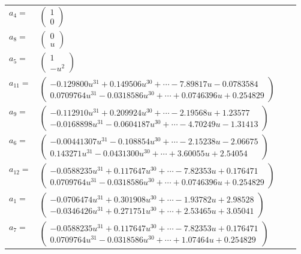 \documentclass[1p]{elsarticle_modified}
\theoremstyle{definition}
\begin{document}
\begin{tabular}{m{7pt} m{180pt} m{7pt} m{180pt} }
\flushright $a_{4}=$&$\begin{pmatrix}1\\0\end{pmatrix}$ \\
\flushright $a_{8}=$&$\begin{pmatrix}0\\u\end{pmatrix}$ \\
\flushright $a_{5}=$&$\begin{pmatrix}1\\- u^2\end{pmatrix}$ \\
\flushright $a_{11}=$&$\begin{pmatrix}-0.129800 u^{31}+0.149506 u^{30}+\cdots-7.89817 u-0.0783584\\0.0709764 u^{31}-0.0318586 u^{30}+\cdots+0.0746396 u+0.254829\end{pmatrix}$ \\
\flushright $a_{9}=$&$\begin{pmatrix}-0.112910 u^{31}+0.209924 u^{30}+\cdots-2.19568 u+1.23577\\-0.0168898 u^{31}-0.0604187 u^{30}+\cdots-4.70249 u-1.31413\end{pmatrix}$ \\
\flushright $a_{6}=$&$\begin{pmatrix}-0.00441307 u^{31}-0.108854 u^{30}+\cdots-2.15238 u-2.06675\\0.143271 u^{31}-0.0431300 u^{30}+\cdots+3.60055 u+2.54054\end{pmatrix}$ \\
\flushright $a_{12}=$&$\begin{pmatrix}-0.0588235 u^{31}+0.117647 u^{30}+\cdots-7.82353 u+0.176471\\0.0709764 u^{31}-0.0318586 u^{30}+\cdots+0.0746396 u+0.254829\end{pmatrix}$ \\
\flushright $a_{1}=$&$\begin{pmatrix}-0.0706474 u^{31}+0.301908 u^{30}+\cdots-1.93782 u+2.98528\\-0.0346426 u^{31}+0.271751 u^{30}+\cdots+2.53465 u+3.05041\end{pmatrix}$ \\
\flushright $a_{7}=$&$\begin{pmatrix}-0.0588235 u^{31}+0.117647 u^{30}+\cdots-7.82353 u+0.176471\\0.0709764 u^{31}-0.0318586 u^{30}+\cdots+1.07464 u+0.254829\end{pmatrix}$ \\

\end{tabular}
\end{document}
